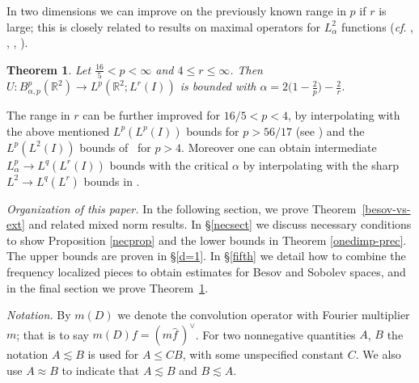 \documentclass[11pt]{amsart}
\newtheorem{theorem}{Theorem}[section]
\newtheorem{corollary}[theorem]{Corollary}
\theoremstyle{definition}
\numberwithin{theorem}{section}
\numberwithin{definition}{section}
\numberwithin{equation}{section}
\newcommand{\R}{\mathbb{R}}
\renewcommand{\le}{\leqslant}
\def\R{\mathbb R}
\def\cf{{\it cf}}
\def\lc{\lesssim}
\def\bbR{{\mathbb {R}}}
\renewcommand{\le}{\leqslant}
\begin{document}
In two dimensions we can improve on the previously known  range in
$p$
if  $r$ is large; %
this  is closely related  to  results on  maximal operators for
$L^2_\alpha$ functions  (\cf. \cite{planch}, \cite{le1}, \cite{ro}, \cite{lerova}).
\begin{theorem}
\label{pop1} Let $\frac {16}{5}<p<\infty$ and $4\le r\le\infty$.
Then $U: B^p_{\alpha,p}(\bbR^2)\to L^p(\bbR^{2};L^r(I))$ is bounded
with $\alpha=2\big(1-\frac 2p\big)-\frac 2r$.
\end{theorem}
The range in $r$   can be further improved for $16/5<p<4$, by
interpolating with the above mentioned $L^p(L^p(I))$ bounds for
$p>56/17$ (see \cite{bogu}) and  the $L^p(L^2(I))$ bounds
of~\cite{lerose} for $p>4$. Moreover one can obtain intermediate
$L^p_\alpha\to L^q(L^r(I))$ bounds with the critical $\alpha$ by
interpolating with the sharp $L^2\to L^q(L^r)$ bounds in
\cite{lerova}.




\medskip

{\it Organization of this  paper.}  In the following section, we
prove Theorem~\ref{besov-vs-ext} and related mixed norm results. In
\S \ref{necsect} we discuss necessary conditions to show Proposition
\ref{necprop} and the  lower bounds in Theorem \ref{onedimp-prec}.
The upper bounds are proven in \S \ref{d=1}. In \S \ref{fifth} we
detail how to combine the frequency localized pieces to obtain
estimates for Besov and Sobolev spaces, and in the final section we
prove Theorem~\ref{pop1}.


\medskip

{\it Notation.} By $m(D)$ we denote the convolution operator
with Fourier multiplier
$m$; that is to say $m(D)f=(m\widehat f\,)^\vee$.
For two nonnegative quantities $A$, $B$ the notation $A\lc B$ is used for $A\le CB$, with  some unspecified constant $C$.
We also use $A\approx B$ to indicate that $A\lc B$ and $B\lc A$.
\end{document}
